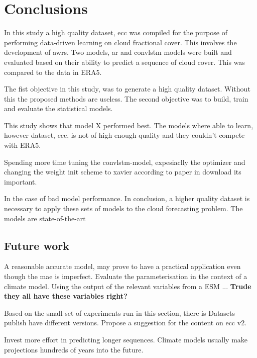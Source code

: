 \chapter{Conclusions}
In this study a high quality dataset, \acrfull{ecc} was compiled for the purpose of performing data-driven learning on cloud fractional cover. This involves the development of \acrfull{awrs}. %
Two models, \acrfull{ar} and \acrfull{convlstm} models were built and evaluated based on their ability to predict a sequence of cloud cover. This was compared to the data in ERA5. 

The fist objective in this study, was to generate a high quality dataset. Without this the proposed methods are useless. The second objective was to build, train and evaluate the statistical models. 

This study shows that model X performed best. The models where able to learn, however dataset, \acrshort{ecc}, is not of high enough quality and they couldn't compete with ERA5.

Spending more time tuning the \acrshort{convlstm}-model, expesiaclly the optimizer and changing the weight init scheme to xavier according to paper in download its important. 

In the case of bad model performance. In conclusion, a higher quality dataset is necessary to apply these sets of models to the cloud forecasting problem. The models are state-of-the-art 

\section{Future work}
A reasonable accurate model, may prove to have a practical application even though the \acrshort{mae} is imperfect. Evaluate the parameterisation in the context of a climate model. Using the output of the relevant variables from a \acrshort{ESM} ... \textbf{Trude they all have these variables right?}

Based on the small set of experiments run in this section, there is 
Datasets publish have different versions. Propose a suggestion for the content on \acrshort{ecc} v2.

Invest more effort in predicting longer sequences. Climate models usually make projections hundreds of years into the future.

